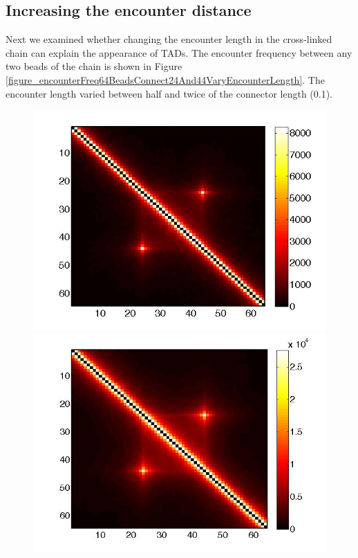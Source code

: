 \documentclass[12pt]{book}
\begin{document}
\subsection{Increasing the encounter distance}
Next we examined whether changing the encounter length in the cross-linked chain can explain the appearance of TADs. The encounter frequency between any two beads of the chain is shown in Figure \ref{figure_encounterFreq64BeadsConnect24And44VaryEncounterLength}. The encounter length varied between half and twice of the connector length (0.1).

\begin{figure}[H]
\includegraphics[scale=0.2]{encounterFrequency64BeadsConnect24And44EncounterDist0_05}
\includegraphics[scale=0.19]{encounterFrequency64BeadsConnect24And44EncounterDist0_1}

\end{figure}
\end{document}
